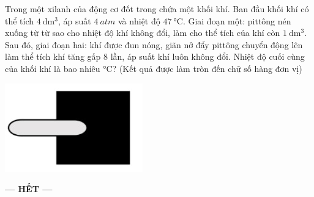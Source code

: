 \begin{ex}
	Trong một xilanh của động cơ đốt trong chứa một khối khí. Ban đầu khối khí có thể tích $\SI{4}{\deci\meter^3}$, áp suất $\SI{4}{atm}$ và nhiệt độ $\SI{47}{\celsius}$. Giai đoạn một: pittông nén xuống từ từ sao cho nhiệt độ khí không đổi, làm cho thể tích của khí còn $\SI{1}{\deci\meter^3}$. Sau đó, giai đoạn hai: khí được đun nóng, giãn nở đẩy pittông chuyển động lên làm thể tích khí tăng gấp 8 lần, áp suất khí luôn không đổi. Nhiệt độ cuối cùng của khối khí là bao nhiêu $\si{\celsius}$? (Kết quả được làm tròn đến chữ số hàng đơn vị)
\end{ex}
\begin{ex}
{\includegraphics[scale=0.8]{../figs/FINAL-SEM1-003-8}}
\end{ex}
\begin{center}
	\textbf{--- HẾT ---}
\end{center}
